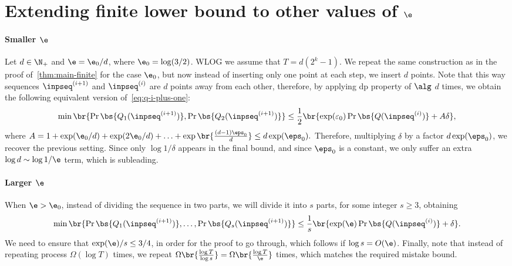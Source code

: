 \section{Extending finite lower bound to other values of \(\e\)}
\label{app:all-eps}
\paragraph{Smaller \(\e\)}
Let \(d \in \N_+\) and \(\e = \e_0 / d\), where \(\e_0 = \log(3/2)\).
WLOG we assume that \(T = d (2^k - 1)\). 
We repeat the same construction as in the proof of~\cref{thm:main-finite} for the case \(\e_0\),
but now instead of inserting only one point at each step, we insert \(d\) points.
Note that this way sequences \(\inpseq^{(i+1)}\) and \(\inpseq^{(i)}\) are \(d\) points away from each other, therefore, by applying \Gls{dp} property of \(\alg\) \(d\) times, 
we obtain the following equivalent version of~\cref{eq:q-i-plus-one}:
\begin{equation}
    \min\br{\Pr\bs{Q_1(\inpseq^{(i+1)})}, \Pr\bs{Q_2(\inpseq^{(i+1)})}}
    \leq \frac{1}{2} \br{\exp(\varepsilon_0) \Pr\bs{Q(\inpseq^{(i)})} + A\delta},
\end{equation}
where \(A = 1 + \exp(\e_0 / d) + \exp(2\e_0 / d) + \ldots + \exp\br{\frac{(d - 1)\eps_0}{d}} \leq d \exp(\eps_0).\)
Therefore, multiplying \(\delta\) by a factor \(d \exp(\eps_0)\), we recover the previous setting. 
Since only \(\log 1 / \delta\) appears in the final bound, and since \(\eps_0\) is a constant, we only suffer an extra \(\log d \sim \log 1 / \e\) term,
which is subleading.

\paragraph{Larger \(\e\)}
When \(\e > \e_0\), instead of dividing the sequence in two parts, we will divide it into \(s\) parts, for some integer \(s \geq 3\), obtaining
\begin{equation}
    \min\br{\Pr\bs{Q_1(\inpseq^{(i+1)})}, \ldots, \Pr\bs{Q_s(\inpseq^{(i+1)})}}
    \leq \frac{1}{s} \br{\exp(\e) \Pr\bs{Q(\inpseq^{(i)})} + \delta}.
\end{equation}
We need to ensure that \(\exp(\e) / s \leq 3/4\), in order for the proof to go through, which follows if \(\log s = O(\e)\). 
Finally, note that instead of repeating process \(\Omega(\log T)\) times, we repeat \(\Omega\br{\frac{\log T}{\log s}} = \Omega\br{\frac{\log T}{\e}}\) times,
which matches the required mistake bound.
